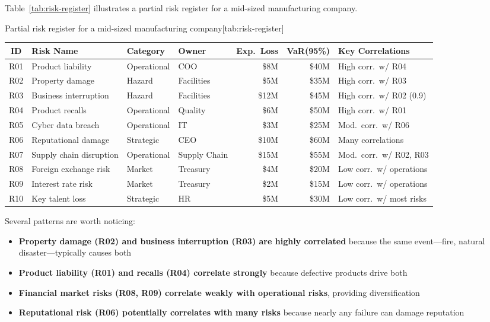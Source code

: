 \documentclass[11pt,openany]{book}
\providecommand{\tightlist}{\setlength{\itemsep}{0pt}\setlength{\parskip}{0pt}}
\begin{document}
Table~\ref{tab:risk-register} illustrates a partial risk register for a
mid-sized manufacturing company.

\begin{ermtable}{Partial risk register for a mid-sized manufacturing company}[tab:risk-register]
\begin{tabularx}{\textwidth}{@{}clllrrY@{}}
\toprule
\textbf{ID} & \textbf{Risk Name} & \textbf{Category} & \textbf{Owner} &
\textbf{Exp.\ Loss} & \textbf{VaR(95\%)} & \textbf{Key Correlations} \\
\midrule
R01 & Product liability & Operational & COO & \$8M & \$40M & High corr.\ w/ R04 \\
R02 & Property damage & Hazard & Facilities & \$5M & \$35M & High corr.\ w/ R03 \\
R03 & Business interruption & Hazard & Facilities & \$12M & \$45M & High corr.\ w/ R02 (0.9) \\
R04 & Product recalls & Operational & Quality & \$6M & \$50M & High corr.\ w/ R01 \\
R05 & Cyber data breach & Operational & IT & \$3M & \$25M & Mod.\ corr.\ w/ R06 \\
R06 & Reputational damage & Strategic & CEO & \$10M & \$60M & Many correlations \\
R07 & Supply chain disruption & Operational & Supply Chain & \$15M & \$55M & Mod.\ corr.\ w/ R02, R03 \\
R08 & Foreign exchange risk & Market & Treasury & \$4M & \$20M & Low corr.\ w/ operations \\
R09 & Interest rate risk & Market & Treasury & \$2M & \$15M & Low corr.\ w/ operations \\
R10 & Key talent loss & Strategic & HR & \$5M & \$30M & Low corr.\ w/ most risks \\
\bottomrule
\end{tabularx}
\end{ermtable}

Several patterns are worth noticing:

\begin{itemize}\tightlist
  \item \textbf{Property damage (R02) and business interruption (R03) are
        highly correlated} because the same event---fire, natural
        disaster---typically causes both
  \item \textbf{Product liability (R01) and recalls (R04) correlate strongly}
        because defective products drive both
  \item \textbf{Financial market risks (R08, R09) correlate weakly with
        operational risks}, providing diversification
  \item \textbf{Reputational risk (R06) potentially correlates with many
        risks} because nearly any failure can damage reputation
\end{itemize}
\end{document}

